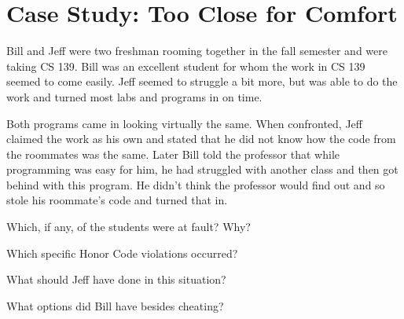 \section*{Case Study: Too Close for Comfort}

Bill and Jeff were two freshman rooming together in the fall semester and were taking CS 139.
Bill was an excellent student for whom the work in CS 139 seemed to come easily.
Jeff seemed to struggle a bit more, but was able to do the work and turned most labs and programs in on time.

\vspace{1em}

Both programs came in looking virtually the same.
When confronted, Jeff claimed the work as his own and stated that he did not know how the code from the roommates was the same.
Later Bill told the professor that while programming was easy for him, he had struggled with another class and then got behind with this program.
He didn't think the professor would find out and so stole his roommate's code and turned that in.




\Q Which, if any, of the students were at fault? Why?

\begin{answer}[6em]
\end{answer}


\Q Which specific Honor Code violations occurred?

\begin{answer}[6em]
\end{answer}


\Q What should Jeff have done in this situation?

\begin{answer}[6em]
\end{answer}


\Q What options did Bill have besides cheating?

\begin{answer}[6em]
\end{answer}
